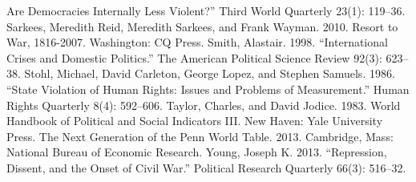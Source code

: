 \documentclass[ignorenonframetext,]{beamer}
\begin{document}
\begin{frame}[fragile]
Are Democracies Internally Less Violent?'' Third World Quarterly 23(1):
119--36. Sarkees, Meredith Reid, Meredith Sarkees, and Frank Wayman.
2010. Resort to War, 1816-2007. Washington: CQ Press. Smith, Alastair.
1998. ``International Crises and Domestic Politics.'' The American
Political Science Review 92(3): 623--38. Stohl, Michael, David Carleton,
George Lopez, and Stephen Samuels. 1986. ``State Violation of Human
Rights: Issues and Problems of Measurement.'' Human Rights Quarterly
8(4): 592--606. Taylor, Charles, and David Jodice. 1983. World Handbook
of Political and Social Indicators III. New Haven: Yale University
Press. The Next Generation of the Penn World Table. 2013. Cambridge,
Mass: National Bureau of Economic Research. Young, Joseph K. 2013.
``Repression, Dissent, and the Onset of Civil War.'' Political Research
Quarterly 66(3): 516--32.

\end{frame}
\end{document}
